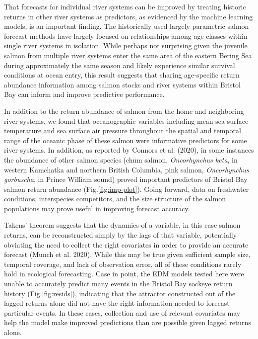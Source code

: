 \documentclass[
]{article}
\begin{document}
That forecasts for individual river systems can be improved by treating historic returns in other river systems as predictors, as evidenced by the machine learning models, is an important finding. The historically used largely parametric salmon forecast methods have largely focused on relationships among age classes within single river systems in isolation. While perhaps not surprising given the juvenile salmon from multiple river systems enter the same area of the eastern Bering Sea during approximately the same season and likely experience similar survival conditions at ocean entry, this result suggests that sharing age-specific return abundance information among salmon stocks and river systems within Bristol Bay can inform and improve predictive performance.

In addition to the return abundance of salmon from the home and neighboring river systems, we found that oceanographic variables including mean sea surface temperature and sea surface air pressure throughout the spatial and temporal range of the oceanic phase of these salmon were informative predictors for some river systems. In addition, as reported by Connors et al. (2020), in some instances the abundance of other salmon species (chum salmon, \emph{Oncorhynchus keta}, in western Kamchatka and northern British Columbia, pink salmon, \emph{Oncorhynchus gorbuscha}, in Prince William sound) proved important predictors of Bristol Bay salmon return abundance (Fig.\ref{fig:imp-plot}). Going forward, data on freshwater conditions, interspecies competitors, and the size structure of the salmon populations may prove useful in improving forecast accuracy.

Takens' theorem suggests that the dynamics of a variable, in this case salmon returns, can be reconstructed simply by the lags of that variable, potentially obviating the need to collect the right covariates in order to provide an accurate forecast (Munch et al. 2020). While this may be true given sufficient sample size, temporal coverage, and lack of observation error, all of these conditions rarely hold in ecological forecasting. Case in point, the EDM models tested here were unable to accurately predict many events in the Bristol Bay sockeye return history (Fig.\ref{fig:resids}), indicating that the attractor constructed out of the lagged returns alone did not have the right information needed to forecast particular events. In these cases, collection and use of relevant covariates may help the model make improved predictions than are possible given lagged returns alone.
\end{document}
